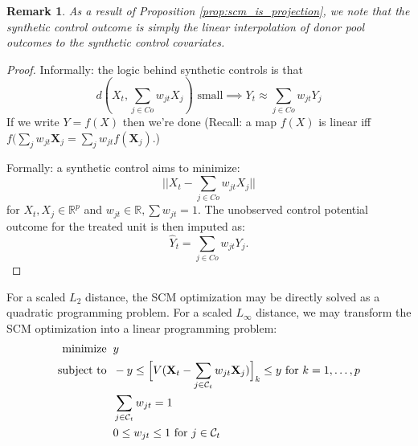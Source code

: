 \documentclass{article}
\newtheorem{remark}{Remark}
\newcommand{\Xt}{\mathbf{X}_t}
\newcommand{\Xj}{\mathbf{X}_j}
\newcommand{\Ct}{\mathcal{C}_{t}}
\begin{document}
\begin{remark}
As a result of Proposition \ref{prop:scm_is_projection}, we note that the synthetic control outcome is simply the linear interpolation of donor pool outcomes to the synthetic control covariates.
\end{remark}
\begin{proof}
    
    Informally: the logic behind synthetic controls is that
    \begin{equation*}
        d(X_t, \sum_{j \in Co} w_{jt} X_j) \text{ small}
        \implies Y_t \approx \sum_{j \in Co} w_{jt} Y_j
    \end{equation*}
    If we write $Y = f(X)$ then we're done (Recall: a map $f(X)$ is linear iff $f(\sum_j w_{jt} \Xj = \sum_j w_{jt} f(\Xj)$.)
    
    Formally: a synthetic control aims to minimize:
    \begin{equation*}
        ||X_t - \sum_{j \in Co} w_{jt} X_j||
    \end{equation*}
    for $X_t, X_j \in \mathbb{R}^p$ and $w_{jt} \in \mathbb{R}, \sum w_{jt} = 1$.
    The unobserved control potential outcome for the treated unit is then imputed as:
    \begin{equation*}
        \hat{Y}_t = \sum_{j \in Co} w_{jt} Y_j.
    \end{equation*}
\end{proof}


For a scaled $L_2$ distance, the SCM optimization may be directly solved as a quadratic programming problem.
For a scaled $L_\infty$ distance, we may transform the SCM optimization into a linear programming problem:
\begin{align*}
    \text{minimize} &\hspace{2mm} y \\
    \text{subject to} &\hspace{2mm} -y \leq \Big[ V(\Xt - \sum_{j \in \Ct} w_{jt} \Xj) \Big]_k \leq y \text{ for } k = 1, \dots, p \\
    &\hspace{2mm} \sum_{j \in \Ct} w_{jt} = 1 \\
    &\hspace{2mm} 0 \leq w_{jt} \leq 1 \text{ for } j \in \Ct
\end{align*}
\end{document}
